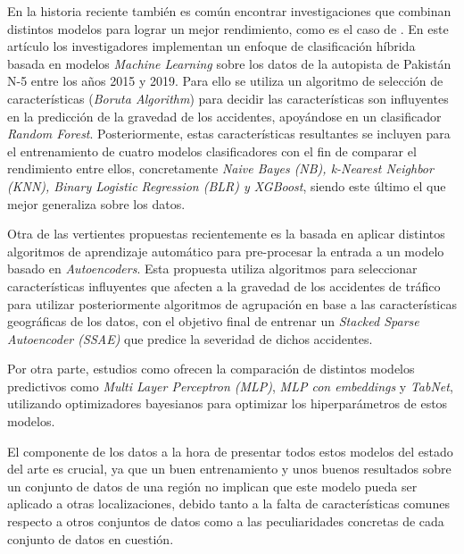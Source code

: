 \documentclass{uathesis-es}
\begin{document}
	En la historia reciente también es común encontrar investigaciones que combinan distintos modelos para lograr un mejor rendimiento, como es el caso de \cite{zhang2022hybrid}. En este artículo los investigadores implementan un enfoque de clasificación híbrida basada en modelos \textit{Machine Learning} sobre los datos de la autopista de Pakistán N-5 entre los años 2015 y 2019. Para ello se utiliza un algoritmo de selección de características (\textit{Boruta Algorithm}) para decidir las características son influyentes en la predicción de la gravedad de los accidentes, apoyándose en un clasificador \textit{Random Forest}. Posteriormente, estas características resultantes se incluyen para el entrenamiento de cuatro modelos clasificadores con el fin de comparar el rendimiento entre ellos, concretamente \textit{Naive Bayes (NB), k-Nearest Neighbor (KNN), Binary Logistic Regression (BLR) y XGBoost}, siendo este último el que mejor generaliza sobre los datos.
	
	
	
	
	
	Otra de las vertientes propuestas recientemente es la basada en aplicar distintos algoritmos de aprendizaje automático para pre-procesar la entrada a un modelo basado en \textit{Autoencoders}. Esta propuesta utiliza algoritmos para seleccionar características influyentes que afecten a la gravedad de los accidentes de tráfico para utilizar posteriormente algoritmos de agrupación en base a las características geográficas de los datos, con el objetivo final de entrenar un \textit{Stacked Sparse Autoencoder (SSAE)} \cite{ma2021analytic} que predice la severidad de dichos accidentes.
	
	Por otra parte, estudios como \cite{Sattar2023} ofrecen la comparación de distintos modelos predictivos como \textit{Multi Layer Perceptron (MLP)}, \textit{MLP con embeddings} y \textit{TabNet}, utilizando optimizadores bayesianos para optimizar los hiperparámetros de estos modelos.
	
	El componente de los datos a la hora de presentar todos estos modelos del estado del arte es crucial, ya que un buen entrenamiento y unos buenos resultados sobre un conjunto de datos de una región no implican que este modelo pueda ser aplicado a otras localizaciones, debido tanto a la falta de características comunes respecto a otros conjuntos de datos como a las peculiaridades concretas de cada conjunto de datos en cuestión.
	
\end{document}

